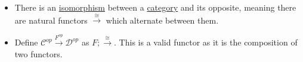 \begin{itemize}
    \item  There is an \hyperref[D3.28]{isomorphism} between a \hyperref[D3.6]{category} and its opposite, meaning there are natural functors $\overset{\cong}\rightarrow$ which alternate between them.
    \item Define $\mathcal{C}^{op}\xrightarrow{F^{op}}\mathcal{D}^{op}$ as $F ; \overset{\cong}\rightarrow$. This is a valid functor as it is the composition of two functors.
  \end{itemize}
